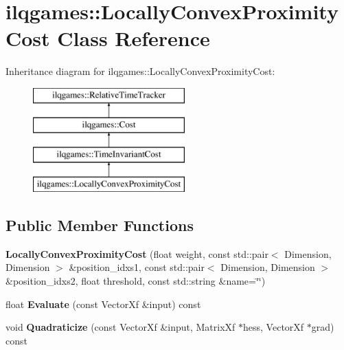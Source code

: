 \hypertarget{classilqgames_1_1_locally_convex_proximity_cost}{}\section{ilqgames\+:\+:Locally\+Convex\+Proximity\+Cost Class Reference}
\label{classilqgames_1_1_locally_convex_proximity_cost}
Inheritance diagram for ilqgames\+:\+:Locally\+Convex\+Proximity\+Cost\+:\begin{figure}[H]
\begin{center}
\leavevmode
\includegraphics[height=4.000000cm]{classilqgames_1_1_locally_convex_proximity_cost}
\end{center}
\end{figure}
\subsection*{Public Member Functions}
\begin{DoxyCompactItemize}
\item 
{\bfseries Locally\+Convex\+Proximity\+Cost} (float weight, const std\+::pair$<$ Dimension, Dimension $>$ \&position\+\_\+idxs1, const std\+::pair$<$ Dimension, Dimension $>$ \&position\+\_\+idxs2, float threshold, const std\+::string \&name=\char`\"{}\char`\"{})\hypertarget{classilqgames_1_1_locally_convex_proximity_cost_aabea3cea381b56639bcb4e60df93ee48}{}\label{classilqgames_1_1_locally_convex_proximity_cost_aabea3cea381b56639bcb4e60df93ee48}

\item 
float {\bfseries Evaluate} (const Vector\+Xf \&input) const \hypertarget{classilqgames_1_1_locally_convex_proximity_cost_ae0f309dfa69dc2c46158afda394af9e3}{}\label{classilqgames_1_1_locally_convex_proximity_cost_ae0f309dfa69dc2c46158afda394af9e3}

\item 
void {\bfseries Quadraticize} (const Vector\+Xf \&input, Matrix\+Xf $\ast$hess, Vector\+Xf $\ast$grad) const \hypertarget{classilqgames_1_1_locally_convex_proximity_cost_adf826e1e1063bad897a5dcce3c3bc44c}{}\label{classilqgames_1_1_locally_convex_proximity_cost_adf826e1e1063bad897a5dcce3c3bc44c}

\end{DoxyCompactItemize}
